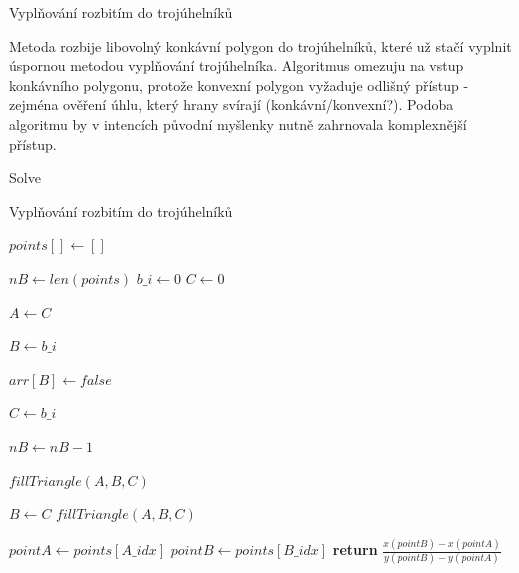 \documentclass[a4paper,12pt]{book}
\begin{document}
Vyplňování rozbitím do trojúhelníků

Metoda rozbije libovolný konkávní polygon do trojúhelníků, které už stačí vyplnit úspornou metodou vyplňování trojúhelníka.
Algoritmus omezuju na vstup konkávního polygonu, protože konvexní polygon vyžaduje odlišný přístup - zejména ověření úhlu, který hrany svírají (konkávní/konvexní?). Podoba algoritmu by v intencích původní myšlenky nutně zahrnovala komplexnější přístup.





\begin{algorithm}
\ContinuedFloat
\caption{Solve}
\begin{algorithmic}
\caption{Vyplňování rozbitím do trojúhelníků}
\State $points[] \gets []$

\State $nB \gets len(points)$
\State $b\_i \gets 0$
\State $C \gets 0$


\State $A \gets C$

\EndWhile

\State $B \gets b\_i$

\State $arr[B] \gets false$

\EndWhile

\State $C \gets b\_i$

\State $nB \gets nB-1$

\State $fillTriangle(A,B,C)$

\EndWhile

\State $B \gets C$
\EndWhile
\State $fillTriangle(A,B,C)$
\EndFunction

    \State $pointA \gets points[A\_idx]$
    \State $pointB \gets points[B\_idx]$
    \State \textbf{return} $\frac{x(pointB)-x(pointA)}{y(pointB)-y(pointA)}$
\EndFunction
\end{algorithmic}
\end{algorithm}
\end{document}

